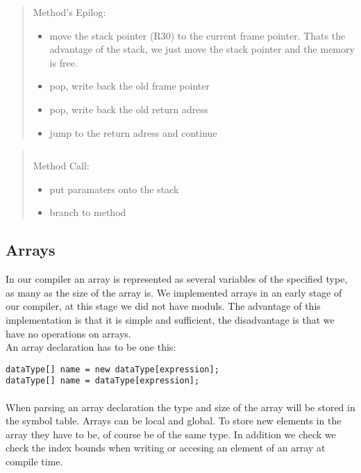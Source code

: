 \begin{quote}
Method's Epilog: \\
\begin{itemize}
  \item move the stack pointer (R30) to the current frame pointer. Thats the advantage of the stack, we just move the stack pointer and the
  memory is free.
  \item pop, write back the old frame pointer
  \item pop, write back the old return adress
  \item jump to the return adress and continue
\end{itemize}
\end{quote}
\begin{quote}
\begin{verbatim}

\end{verbatim}
Method Call: \\
\begin{itemize}
  \item put paramaters onto the stack
  \item branch to method
\end{itemize}

\end{quote}

\subsection{Arrays}
\label{labelArrays}
In our compiler an array is represented as several variables of the specified type, as many as the size of the array is. We implemented arrays
in an early stage of our compiler, at this stage we did not have moduls. The advantage of this implementation is that it is simple and
sufficient, the disadvantage is that we have no operations on arrays. \\
An array declaration has to be one this:
\begin{lstlisting}[caption={array declaration}]
dataType[] name = new dataType[expression];
dataType[] name = dataType[expression];
\end{lstlisting}
\paragraph{}When parsing an array declaration the type and size of the array will be stored in the symbol table. Arrays can be
local and global. To store new elements in the array they have to be, of course be of the same type. In addition we check we check the
index bounds when writing or accesing an element of an array at compile time.  





